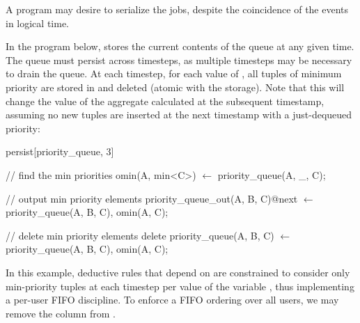 A program may desire to serialize the jobs, despite the coincidence of the
 events in logical time.



In the program below,  stores the current contents of
the queue at any given time.  The queue must persist across timesteps, as
multiple timesteps may be necessary to drain the queue.  At each timestep, for
each value of , all tuples of minimum priority are stored in
 and deleted (atomic with the storage).  Note
that this will change the value of the aggregate calculated at the subsequent
timestamp, assuming no new tuples are inserted at the next timestamp with a
just-dequeued priority:

\begin{Dedalus}
persist[priority\_queue, 3]

// find the min priorities
omin(A, min<C>) \(\leftarrow\)
  priority\_queue(A, _, C);

// output min priority elements
priority_queue_out(A, B, C)@next \(\leftarrow\)
  priority\_queue(A, B, C), omin(A, C);

// delete min priority elements
delete priority\_queue(A, B, C) \(\leftarrow\)
  priority\_queue(A, B, C), omin(A, C);
\end{Dedalus}

In this example, deductive rules that depend on 
are constrained to consider only min-priority tuples at each timestep per value
of the variable , thus implementing a per-user FIFO discipline.  To
enforce a FIFO ordering over all users, we may remove the  column
from .

